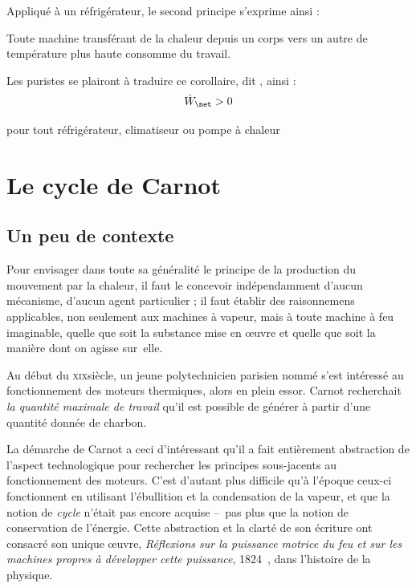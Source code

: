 \begin{description}
{			Appliqué à un réfrigérateur, le second principe s’exprime ainsi :

			\begin{trucimportant}
			Toute machine transférant de la chaleur depuis un corps vers un autre de température plus haute consomme du travail.
			\end{trucimportant}

			Les puristes se plairont à traduire ce corollaire, dit , ainsi :
			\begin{equation}
				\dot W_\net > 0
			\end{equation}
			\begin{equationterms}
				\item pour tout réfrigérateur, climatiseur ou pompe à chaleur
			\end{equationterms}

		}%
		\end{description}


\section{Le cycle de Carnot}
\label{ch_cycle_de_carnot}

	\subsection{Un peu de contexte}
	\label{ch_contexte_cycle_carnot}

			Pour envisager dans toute sa généralité le principe de la production du mouvement par la chaleur, il faut le concevoir indépendamment d’aucun mécanisme, d’aucun agent particulier ; il faut établir des raisonnemens applicables, non seulement aux machines à vapeur, mais à toute machine à feu imaginable, quelle que soit la substance mise en œuvre et quelle que soit la manière dont on agisse sur~elle.

		Au début du \textsc{xix}\ieme siècle, un jeune polytechnicien parisien nommé  s’est intéressé au fonctionnement des moteurs thermiques, alors en plein essor. Carnot recherchait \emph{la quantité maximale de travail} qu’il est possible de générer à partir d’une quantité donnée de charbon.

		La démarche de Carnot a ceci d’intéressant qu’il a fait entièrement abstraction de l’aspect technologique pour rechercher les principes sous-jacents au fonctionnement des moteurs. C’est d’autant plus difficile qu’à l’époque ceux-ci fonctionnent en utilisant l’ébullition et la condensation de la vapeur, et que la notion de \emph{cycle} n’était pas encore acquise --\ pas plus que la notion de conservation de l’énergie. Cette abstraction et la clarté de son écriture ont consacré son unique œuvre, \textit{Réflexions sur la puissance motrice du feu et sur les machines propres à développer cette puissance}, 1824~\cite{carnot1824}, dans l’histoire de la physique.

